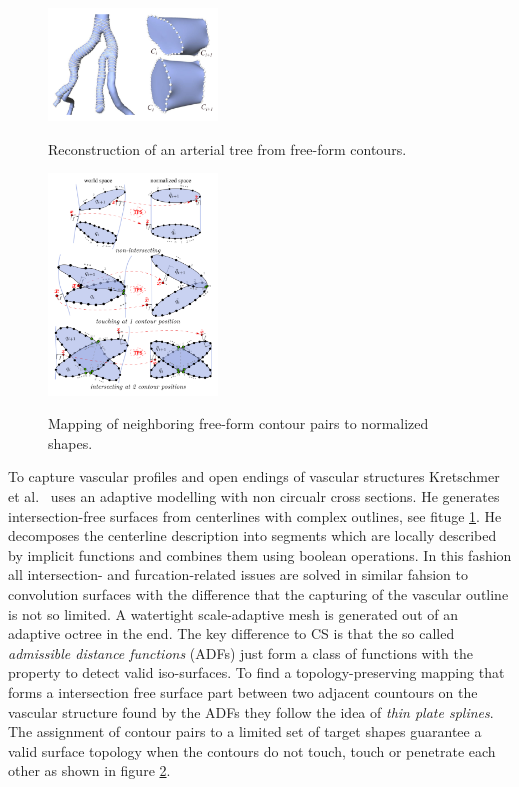 \begin{figure}[h]
	\centering
	\includegraphics[width=0.4\textwidth]{./Images/ReconstructionFreeFormContours.png} \\
	\caption{Reconstruction of an arterial tree from free-form contours.}
	\cite{kretschmer2012reliable}
	\label{fig:ReconstructionFreeFormContours}
\end{figure} 

\begin{figure}[h]
	\centering
	\includegraphics[width=0.4\textwidth]{./Images/IntersectingContours.png} \\
	\caption{Mapping of neighboring free-form contour pairs to normalized shapes.}
	\cite{kretschmer2012reliable}
	\label{fig:IntersectingContours}
\end{figure} 

To capture vascular profiles and open endings of vascular structures Kretschmer et al.~\cite{kretschmer2012reliable} uses an adaptive modelling with non circualr cross sections. He generates intersection-free surfaces from centerlines with complex outlines, see fituge \ref{fig:ReconstructionFreeFormContours}. He decomposes the centerline description into segments which are locally described by implicit functions and combines them using boolean operations. In this fashion all intersection- and furcation-related issues are solved in similar fahsion to convolution surfaces with the difference that the capturing of the vascular outline is not so limited. A watertight scale-adaptive mesh is generated out of an adaptive octree in the end. The key difference to CS is that the so called \emph{admissible distance functions} (ADFs) just form a class of functions with the property to detect valid iso-surfaces. To find a topology-preserving mapping that forms a intersection free surface part between two adjacent countours on the vascular structure found by the ADFs they follow the idea of \emph{thin plate splines}. The assignment of contour pairs to a limited set of target shapes guarantee a valid surface topology when the contours do not touch, touch or penetrate each other as shown in figure \ref{fig:IntersectingContours}.

